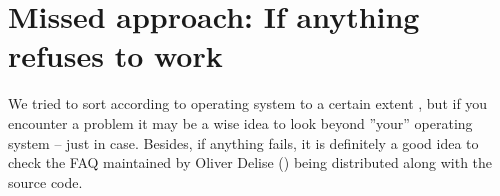 
\chapter{Missed approach: If anything refuses to work\label{missed}}

We tried to sort  according to operating system to a certain extent , but
if you encounter a problem it may be a wise idea to look beyond ''your'' operating system
-- just in case. Besides, if anything fails, it is definitely a good idea to check
the FAQ maintained by Oliver Delise () being distributed
along with the source code.

